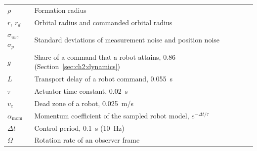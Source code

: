 \documentclass[12pt, letterpaper, oneside]{report}
\begin{document}
\begin{table}[h]
\begin{tabular}{l p{4.2in}}
$\rho$ & Formation radius \\
$r$, $r_d$ & Orbital radius and commanded orbital radius \\
$\sigma_{uv}$, $\sigma_p$ & Standard deviations of measurement noise and position noise \\
$g$ & Share of a command that a robot attains, 0.86 (Section~\ref{sec:ch2:dynamics}) \\
$L$ & Transport delay of a robot command, 0.055~s \\
$\tau$ & Actuator time constant, 0.02~s \\
$v_c$ & Dead zone of a robot, 0.025~m/s \\
$\alpha_{\text{mom}}$ & Momentum coefficient of the sampled robot model, $e^{-\Delta t/\tau}$ \\
$\Delta t$ & Control period, 0.1~s (10~Hz) \\
$\Omega$ & Rotation rate of an observer frame \\
\end{tabular}
\end{table}

\clearpage

\tableofcontents
\clearpage

\listoffigures
{}
\clearpage

\listoftables
{}
\clearpage

\setcounter{page}{1}
\doublespacing











\end{document}

